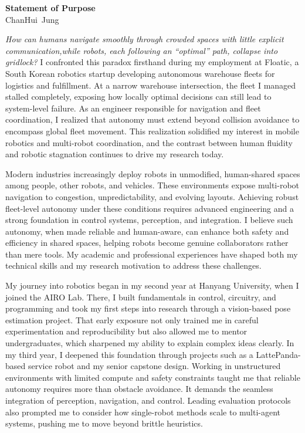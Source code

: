 \documentclass[12pt]{article}
\newcommand\firstName{ChanHui}
\newcommand\lastName{Jung}
\newcommand\fullName{\firstName~\lastName}
\begin{document}
\begin{center}
  {\large\bfseries Statement of Purpose}\\[-0.2em]
  {\normalsize \textcolor{sectiongray}{\fullName}}
\end{center}

\textit{How can humans navigate smoothly through crowded spaces with little explicit communication,while robots, each following an “optimal” path, collapse into gridlock?} I confronted this paradox firsthand during my employment at Floatic, a South Korean robotics startup developing autonomous warehouse fleets for logistics and fulfillment. At a narrow warehouse intersection, the fleet I managed stalled completely, exposing how locally optimal decisions can still lead to system-level failure. As an engineer responsible for navigation and fleet coordination, I realized that autonomy must extend beyond collision avoidance to encompass global fleet movement. This realization solidified my interest in mobile robotics and multi-robot coordination, and the contrast between human fluidity and robotic stagnation continues to drive my research today.

\vspace{0.5em}
Modern industries increasingly deploy robots in unmodified, human-shared spaces among people, other robots, and vehicles. These environments expose multi-robot navigation to congestion, unpredictability, and evolving layouts. Achieving robust fleet-level autonomy under these conditions requires advanced engineering and a strong foundation in control systems, perception, and integration. I believe such autonomy, when made reliable and human-aware, can enhance both safety and efficiency in shared spaces, helping robots become genuine collaborators rather than mere tools. My academic and professional experiences have shaped both my technical skills and my research motivation to address these challenges.

\vspace{0.5em}
My journey into robotics began in my second year at Hanyang University, when I joined the AIRO Lab. There, I built fundamentals in control, circuitry, and programming and took my first steps into research through a vision-based pose estimation project. That early exposure not only trained me in careful experimentation and reproducibility but also allowed me to mentor undergraduates, which sharpened my ability to explain complex ideas clearly. In my third year, I deepened this foundation through projects such as a LattePanda-based service robot and my senior capstone design. Working in unstructured environments with limited compute and safety constraints taught me that reliable autonomy requires more than obstacle avoidance. It demands the seamless integration of perception, navigation, and control. Leading evaluation protocols also prompted me to consider how single-robot methods scale to multi-agent systems, pushing me to move beyond brittle heuristics.
\end{document}
